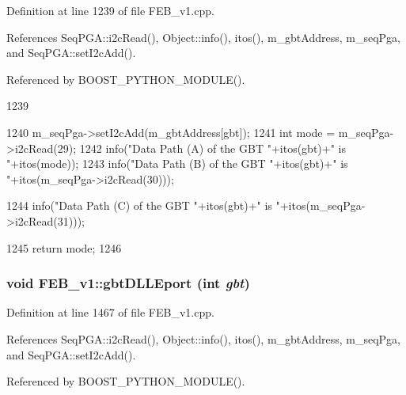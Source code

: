 Definition at line 1239 of file FEB\_\-v1.cpp.

References SeqPGA::i2cRead(), Object::info(), itos(), m\_\-gbtAddress, m\_\-seqPga, and SeqPGA::setI2cAdd().

Referenced by BOOST\_\-PYTHON\_\-MODULE().


\begin{DoxyCode}
1239                                 {
1240   m_seqPga->setI2cAdd(m_gbtAddress[gbt]);
1241   int mode = m_seqPga->i2cRead(29);
1242   info("Data Path (A) of the GBT "+itos(gbt)+" is "+itos(mode));
1243   info("Data Path (B) of the GBT "+itos(gbt)+" is "+itos(m_seqPga->i2cRead(30)));
      
1244   info("Data Path (C) of the GBT "+itos(gbt)+" is "+itos(m_seqPga->i2cRead(31)));
      
1245   return mode; 
1246 }
\end{DoxyCode}
\hypertarget{classFEB__v1_add5e12a5351c0c4986d24f433155351b}{
\subsubsection[{gbtDLLEport}]{\setlength{\rightskip}{0pt plus 5cm}void FEB\_\-v1::gbtDLLEport (int {\em gbt})}}
\label{classFEB__v1_add5e12a5351c0c4986d24f433155351b}


Definition at line 1467 of file FEB\_\-v1.cpp.

References SeqPGA::i2cRead(), Object::info(), itos(), m\_\-gbtAddress, m\_\-seqPga, and SeqPGA::setI2cAdd().

Referenced by BOOST\_\-PYTHON\_\-MODULE().


